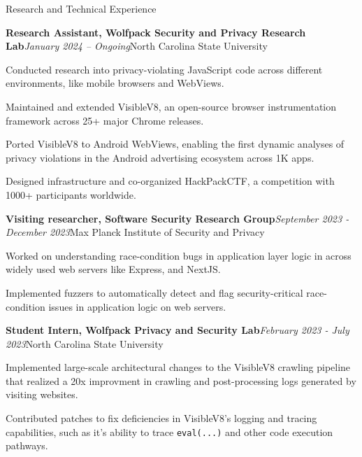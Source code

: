 \documentclass{resume} %
\begin{document}
\begin{rSection}{Research and Technical Experience}
\begin{rSubsection}{\bf Research Assistant, Wolfpack Security and Privacy Research Lab}{\em January 2024 -- Ongoing}{North Carolina State University}{}
\item Conducted research into privacy-violating JavaScript code across different environments, like mobile browsers and WebViews.
\item Maintained and extended VisibleV8, an open-source browser instrumentation framework across 25+ major Chrome releases.
\item Ported VisibleV8 to Android WebViews, enabling the first dynamic analyses of privacy violations in the Android advertising ecosystem across 1K apps.
\item Designed infrastructure and co-organized HackPackCTF, a competition with 1000+ participants worldwide.
\end{rSubsection}
\begin{rSubsection}{\bf Visiting researcher, Software Security Research Group}{\em September 2023 - December 2023}{Max Planck Institute of Security and Privacy}{}
\item Worked on understanding race-condition bugs in application layer logic in across widely used web servers like Express, and NextJS.
\item Implemented fuzzers to automatically detect and flag security-critical race-condition issues in application logic on web servers.
\end{rSubsection}
\begin{rSubsection}{\bf Student Intern, Wolfpack Privacy and Security Lab}{\em February 2023 - July 2023}{North Carolina State University}{}
\item Implemented large-scale architectural changes to the VisibleV8 crawling pipeline that realized a 20x improvment in crawling and post-processing logs generated by visiting websites.
\item Contributed patches to fix deficiencies in VisibleV8's logging and tracing capabilities, such as it's ability to trace \texttt{eval(...)} and other code execution pathways.

\end{rSubsection}
\end{rSection}
\end{document}
